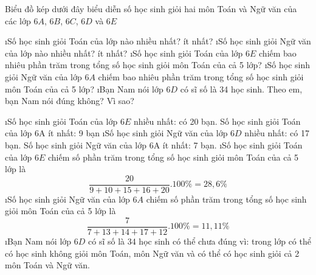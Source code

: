 \begin{bt}
	Biểu đồ kép dưới đây biểu diễn số học sinh giỏi hai môn Toán và Ngữ văn của các lớp $6A$, $6B$, $6C$, $6D$ và $6E$
	
	\begin{enumerate}[a),leftmargin=*]
		\i Số học sinh giỏi Toán của lớp nào nhiều nhất? ít nhất?
		\i Số học sinh giỏi Ngữ văn của lớp nào nhiều nhất? ít nhất?
		\i Số học sinh giỏi Toán của lớp $6E$ chiếm bao nhiêu phần trăm trong tổng số học sinh giỏi môn Toán của cả 5 lớp?
		\i Số học sinh giỏi Ngữ văn của lớp $6A$ chiếm bao nhiêu phần trăm trong tổng số học sinh giỏi môn Toán của cả 5 lớp?
		\i Bạn Nam nói lớp $6D$ có sĩ số là 34 học sinh. Theo em, bạn Nam nói đúng không? Vì sao?
	\end{enumerate}
	\begin{loigiaichuong40}
		\begin{enumerate}[a),leftmargin=*]
			\i Số học sinh giỏi Toán của lớp $6E$ nhiều nhất: có 20 bạn. Số học sinh giỏi Toán của lớp 6A ít nhất: 9 bạn
			\i Số học sinh giỏi Ngữ văn của lớp $6D$ nhiều nhất: có 17 bạn. Số học sinh giỏi Ngữ văn của lớp 6A ít nhất: 7 bạn.
			\i Số học sinh giỏi Toán của lớp $6E$ chiếm số phần trăm trong tổng số học sinh giỏi môn Toán của cả 5 lớp là
			\[\frac{{20}}{{9 + 10 + 15 + 16 + 20}}.100\%  = 28,6\%\]
			\i Số học sinh giỏi Ngữ văn của lớp $6A$ chiếm số phần trăm trong tổng số học sinh giỏi môn Toán của cả 5 lớp là
			\[\frac{7}{{7 + 13 + 14 + 17 + 12}}.100\%  = 11,11\%\]
			\i Bạn Nam nói lớp $6D$ có sĩ số là 34 học sinh có thể chưa đúng vì: trong lớp có thể có học sinh không giỏi môn Toán, môn Ngữ văn và có thể có học sinh giỏi cả 2 môn Toán và Ngữ văn.
		\end{enumerate}
	\end{loigiaichuong40}
\end{bt}
